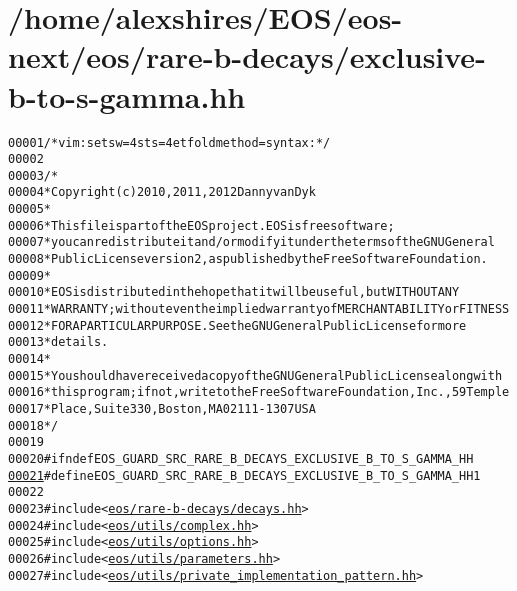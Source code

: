 \hypertarget{exclusive-b-to-s-gamma_8hh_source}{
\section{/home/alexshires/EOS/eos-\/next/eos/rare-\/b-\/decays/exclusive-\/b-\/to-\/s-\/gamma.hh}
}


\begin{footnotesize}\begin{alltt}
00001 \textcolor{comment}{/* vim: set sw=4 sts=4 et foldmethod=syntax : */}
00002 
00003 \textcolor{comment}{/*}
00004 \textcolor{comment}{ * Copyright (c) 2010, 2011, 2012 Danny van Dyk}
00005 \textcolor{comment}{ *}
00006 \textcolor{comment}{ * This file is part of the EOS project. EOS is free software;}
00007 \textcolor{comment}{ * you can redistribute it and/or modify it under the terms of the GNU General}
00008 \textcolor{comment}{ * Public License version 2, as published by the Free Software Foundation.}
00009 \textcolor{comment}{ *}
00010 \textcolor{comment}{ * EOS is distributed in the hope that it will be useful, but WITHOUT ANY}
00011 \textcolor{comment}{ * WARRANTY; without even the implied warranty of MERCHANTABILITY or FITNESS}
00012 \textcolor{comment}{ * FOR A PARTICULAR PURPOSE.  See the GNU General Public License for more}
00013 \textcolor{comment}{ * details.}
00014 \textcolor{comment}{ *}
00015 \textcolor{comment}{ * You should have received a copy of the GNU General Public License along with}
00016 \textcolor{comment}{ * this program; if not, write to the Free Software Foundation, Inc., 59 Temple}
00017 \textcolor{comment}{ * Place, Suite 330, Boston, MA  02111-1307  USA}
00018 \textcolor{comment}{ */}
00019 
00020 \textcolor{preprocessor}{#ifndef EOS\_GUARD\_SRC\_RARE\_B\_DECAYS\_EXCLUSIVE\_B\_TO\_S\_GAMMA\_HH}
\hypertarget{exclusive-b-to-s-gamma_8hh_source_l00021}{}\hyperlink{exclusive-b-to-s-gamma_8hh_a72b09cd65ad01642d109aba1c0203aae}{00021} \textcolor{preprocessor}{}\textcolor{preprocessor}{#define EOS\_GUARD\_SRC\_RARE\_B\_DECAYS\_EXCLUSIVE\_B\_TO\_S\_GAMMA\_HH 1}
00022 \textcolor{preprocessor}{}
00023 \textcolor{preprocessor}{#include <\hyperlink{decays_8hh}{eos/rare-b-decays/decays.hh}>}
00024 \textcolor{preprocessor}{#include <\hyperlink{complex_8hh}{eos/utils/complex.hh}>}
00025 \textcolor{preprocessor}{#include <\hyperlink{options_8hh}{eos/utils/options.hh}>}
00026 \textcolor{preprocessor}{#include <\hyperlink{parameters_8hh}{eos/utils/parameters.hh}>}
00027 \textcolor{preprocessor}{#include <\hyperlink{private__implementation__pattern_8hh}{eos/utils/private_implementation_pattern.hh}>}

\end{alltt}
\end{footnotesize}
